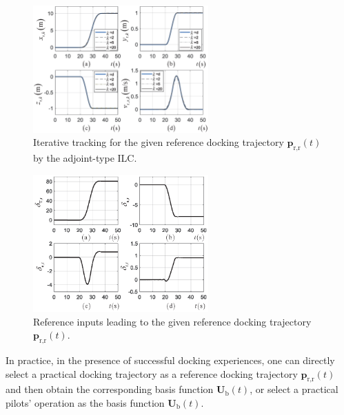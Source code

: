 \begin{figure}[pth]
	\begin{centering}
		\includegraphics[width=0.6\textwidth]{Figures/Figs_Ch10/Output_iter} 
		\par \end{centering}
	\caption{Iterative tracking for the given reference docking trajectory $\mathbf{p}_{\text{r,r}}\left(  t\right)  $ by the adjoint-type ILC.}%
	\label{Fig_Output_iter}%
\end{figure}\begin{figure}[pth]
	\begin{centering}
		\includegraphics[width=0.6\textwidth]{Figures/Figs_Ch10/Input_outerloop} 
		\par \end{centering}
	\caption{Reference inputs leading to the given reference docking trajectory
		$\mathbf{p}_{\text{r,r}}\left(  t\right)  $.}%
	\label{Fig_Input_outerloop}%
\end{figure}

In practice, in the presence of successful docking experiences, one can
directly select a practical docking trajectory as a reference docking
trajectory $\mathbf{p}_{\text{r,r}}\left(  t\right)  $ and then obtain the
corresponding basis function $\mathbf{U}_{\text{b}}\left(  t\right)  $, or
select a practical pilots' operation as the basis function $\mathbf{U}%
_{\text{b}}\left(  t\right)  $.

